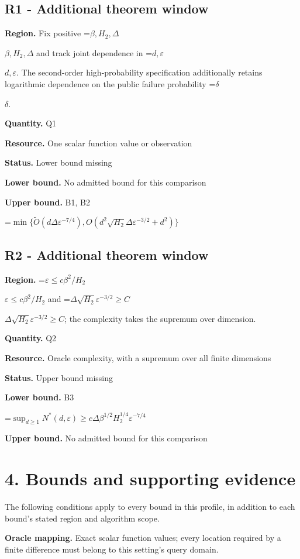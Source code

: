 \documentclass[10pt,a4paper]{article}
\newcommand{\AtlasMath}[1]{\par\begingroup\centering\setbox0=\hbox{$\displaystyle #1$}\ifdim\wd0>1.4\linewidth\typeout{ATLAS WIDE FORMULA: \the\wd0}\fi\ifdim\wd0>\linewidth\resizebox{\linewidth}{!}{\box0}\else\box0\fi\par\endgroup}
\newcommand{\AtlasInlineMath}[1]{\begingroup\setbox0=\hbox{$#1$}\ifdim\wd0>.4\linewidth\endgroup\AtlasMath{#1}\else\endgroup$#1$\fi}
\begin{document}
\subsection{R1 - Additional theorem window}
\textbf{Region.} Fix positive \AtlasInlineMath{\beta,H_2,\Delta} and track joint dependence in \AtlasInlineMath{d,\varepsilon}. The second-order high-probability specification additionally retains logarithmic dependence on the public failure probability \AtlasInlineMath{\delta}.

\textbf{Quantity.} Q1

\textbf{Resource.} One scalar function value or observation

\textbf{Status.} Lower bound missing

\textbf{Lower bound.} No admitted bound for this comparison

\textbf{Upper bound.} B1, B2

\AtlasMath{\min\{\widetilde{O}(d\Delta\varepsilon^{-7/4}),O(d^2\sqrt{H_2}\Delta\varepsilon^{-3/2}+d^2)\}}
\subsection{R2 - Additional theorem window}
\textbf{Region.} \AtlasInlineMath{\varepsilon\le c\beta^2/H_2} and \AtlasInlineMath{\Delta\sqrt{H_2}\varepsilon^{-3/2}\ge C}; the complexity takes the supremum over dimension.

\textbf{Quantity.} Q2

\textbf{Resource.} Oracle complexity, with a supremum over all finite dimensions

\textbf{Status.} Upper bound missing

\textbf{Lower bound.} B3

\AtlasMath{\sup_{d\ge1}N^*(d,\varepsilon)\ge c\Delta\beta^{1/2}H_2^{1/4}\varepsilon^{-7/4}}
\textbf{Upper bound.} No admitted bound for this comparison

\section{4. Bounds and supporting evidence}
The following conditions apply to every bound in this profile, in addition to each bound's stated region and algorithm scope.

\textbf{Oracle mapping.} Exact scalar function values; every location required by a finite difference must belong to this setting's query domain.
\end{document}
